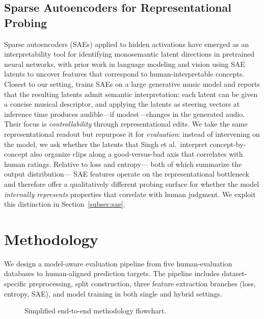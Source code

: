 \documentclass{article}
\begin{document}
\subsection{Sparse Autoencoders for Representational Probing}

Sparse autoencoders (SAEs) applied to hidden activations
have emerged as an interpretability tool
for identifying monosemantic latent directions in pretrained neural networks,
with prior work in language modeling and vision
using SAE latents to uncover features
that correspond to human-interpretable concepts.
Closest to our setting, \cite{singh2025steering}
trains SAEs on a large generative music model
and reports that the resulting latents admit semantic interpretation:
each latent can be given a concise musical descriptor,
and applying the latents as steering vectors at inference time
produces audible---if modest---changes in the generated audio.
Their focus is \emph{controllability} through representational edits.
We take the same representational readout
but repurpose it for \emph{evaluation}:
instead of intervening on the model, we ask whether the latents
that Singh et al.\ interpret concept-by-concept
also organize clips along a good-versus-bad axis
that correlates with human ratings.
Relative to loss and entropy---%
both of which summarize the output distribution---%
SAE features operate on the representational bottleneck
and therefore offer a qualitatively different probing surface
for whether the model \emph{internally represents}
properties that correlate with human judgment.
We exploit this distinction in Section~\ref{subsec:sae}.

\section{Methodology}\label{sec:methodology}

We design a model-aware evaluation pipeline
from five human-evaluation databases to human-aligned prediction targets.
The pipeline includes dataset-specific preprocessing, split construction,
three feature extraction branches (loss, entropy, SAE),
and model training in both single and hybrid settings.

\begin{figure}[t]
  \centering
  \caption{Simplified end-to-end methodology flowchart.}
  \label{fig:pipeline}
\end{figure}
\end{document}
